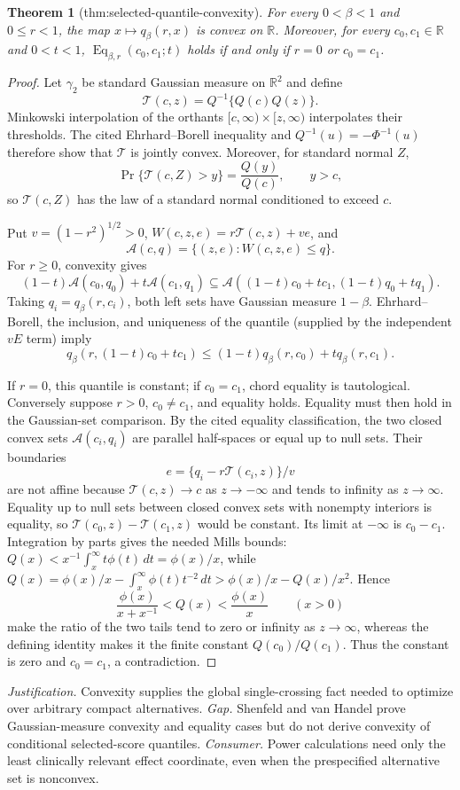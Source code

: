 \documentclass{article}
\newtheorem{theorem}{Theorem}
\begin{document}
\begin{theorem}[thm:selected-quantile-convexity]\label{thm:selected-quantile-convexity}
For every \(0<\beta<1\) and \(0\le r<1\), the map \(x\mapsto q_{\beta}(r,x)\) is convex on \(\mathbb R\). Moreover, for every \(c_0,c_1\in\mathbb R\) and \(0<t<1\), \(\operatorname{Eq}_{\beta,r}(c_0,c_1;t)\) holds if and only if \(r=0\) or \(c_0=c_1\).
\end{theorem}
\begin{proof}
Let \(\gamma_2\) be standard Gaussian measure on \(\mathbb R^2\) and define
\[
\mathcal T(c,z)=Q^{-1}\{Q(c)Q(z)\}.
\]
Minkowski interpolation of the orthants \([c,\infty)\times[z,\infty)\) interpolates their thresholds.  The cited Ehrhard--Borell inequality and \(Q^{-1}(u)=-\Phi^{-1}(u)\) therefore show that \(\mathcal T\) is jointly convex.  Moreover, for standard normal \(Z\),
\[
\Pr\{\mathcal T(c,Z)>y\}=\frac{Q(y)}{Q(c)},\qquad y>c,
\]
so \(\mathcal T(c,Z)\) has the law of a standard normal conditioned to exceed \(c\).

Put \(v=(1-r^2)^{1/2}>0\), \(W(c,z,e)=r\mathcal T(c,z)+ve\), and
\[
\mathcal A(c,q)=\{(z,e):W(c,z,e)\le q\}.
\]
For \(r\ge0\), convexity gives
\[
(1-t)\mathcal A(c_0,q_0)+t\mathcal A(c_1,q_1)
\subseteq\mathcal A((1-t)c_0+tc_1,(1-t)q_0+tq_1).
\]
Taking \(q_i=q_\beta(r,c_i)\), both left sets have Gaussian measure \(1-\beta\).  Ehrhard--Borell, the inclusion, and uniqueness of the quantile (supplied by the independent \(vE\) term) imply
\[
q_\beta(r,(1-t)c_0+tc_1)
\le(1-t)q_\beta(r,c_0)+tq_\beta(r,c_1).
\]

If \(r=0\), this quantile is constant; if \(c_0=c_1\), chord equality is tautological.  Conversely suppose \(r>0\), \(c_0\ne c_1\), and equality holds.  Equality must then hold in the Gaussian-set comparison.  By the cited equality classification, the two closed convex sets \(\mathcal A(c_i,q_i)\) are parallel half-spaces or equal up to null sets.  Their boundaries
\[
e=\{q_i-r\mathcal T(c_i,z)\}/v
\]
are not affine because \(\mathcal T(c,z)\to c\) as \(z\to-\infty\) and tends to infinity as \(z\to\infty\).  Equality up to null sets between closed convex sets with nonempty interiors is equality, so \(\mathcal T(c_0,z)-\mathcal T(c_1,z)\) would be constant.  Its limit at \(-\infty\) is \(c_0-c_1\).  Integration by parts gives the needed Mills bounds: \(Q(x)<x^{-1}\int_x^\infty t\phi(t)\,dt=\phi(x)/x\), while \(Q(x)=\phi(x)/x-\int_x^\infty\phi(t)t^{-2}\,dt>\phi(x)/x-Q(x)/x^2\).  Hence
\[
\frac{\phi(x)}{x+x^{-1}}<Q(x)<\frac{\phi(x)}x\qquad(x>0)
\]
make the ratio of the two tails tend to zero or infinity as \(z\to\infty\), whereas the defining identity makes it the finite constant \(Q(c_0)/Q(c_1)\).  Thus the constant is zero and \(c_0=c_1\), a contradiction.
\end{proof}
\par\smallskip\noindent \textit{Justification.} Convexity supplies the global single-crossing fact needed to optimize over arbitrary compact alternatives. \textit{Gap.} Shenfeld and van Handel prove Gaussian-measure convexity and equality cases but do not derive convexity of conditional selected-score quantiles. \textit{Consumer.} Power calculations need only the least clinically relevant effect coordinate, even when the prespecified alternative set is nonconvex.
\end{document}
